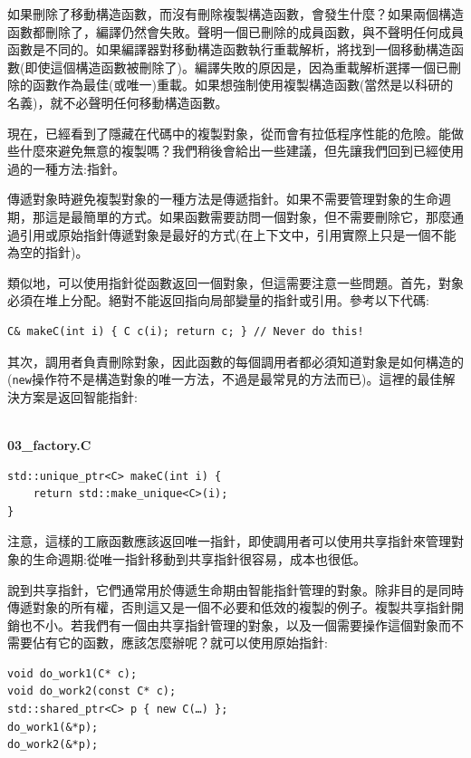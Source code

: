 如果刪除了移動構造函數，而沒有刪除複製構造函數，會發生什麼？如果兩個構造函數都刪除了，編譯仍然會失敗。聲明一個已刪除的成員函數，與不聲明任何成員函數是不同的。如果編譯器對移動構造函數執行重載解析，將找到一個移動構造函數(即使這個構造函數被刪除了)。編譯失敗的原因是，因為重載解析選擇一個已刪除的函數作為最佳(或唯一)重載。如果想強制使用複製構造函數(當然是以科研的名義)，就不必聲明任何移動構造函數。 

現在，已經看到了隱藏在代碼中的複製對象，從而會有拉低程序性能的危險。能做些什麼來避免無意的複製嗎？我們稍後會給出一些建議，但先讓我們回到已經使用過的一種方法:指針。


傳遞對象時避免複製對象的一種方法是傳遞指針。如果不需要管理對象的生命週期，那這是最簡單的方式。如果函數需要訪問一個對象，但不需要刪除它，那麼通過引用或原始指針傳遞對象是最好的方式(在上下文中，引用實際上只是一個不能為空的指針)。 

類似地，可以使用指針從函數返回一個對象，但這需要注意一些問題。首先，對象必須在堆上分配。絕對不能返回指向局部變量的指針或引用。參考以下代碼:

\begin{lstlisting}[style=styleCXX]
C& makeC(int i) { C c(i); return c; } // Never do this!
\end{lstlisting}

其次，調用者負責刪除對象，因此函數的每個調用者都必須知道對象是如何構造的(\texttt{new}操作符不是構造對象的唯一方法，不過是最常見的方法而已)。這裡的最佳解決方案是返回智能指針:

\hspace*{\fill} \\ %
\noindent
\textbf{03\_factory.C}
\begin{lstlisting}[style=styleCXX]
std::unique_ptr<C> makeC(int i) {
	return std::make_unique<C>(i);
}
\end{lstlisting}

注意，這樣的工廠函數應該返回唯一指針，即使調用者可以使用共享指針來管理對象的生命週期:從唯一指針移動到共享指針很容易，成本也很低。

說到共享指針，它們通常用於傳遞生命期由智能指針管理的對象。除非目的是同時傳遞對象的所有權，否則這又是一個不必要和低效的複製的例子。複製共享指針開銷也不小。若我們有一個由共享指針管理的對象，以及一個需要操作這個對象而不需要佔有它的函數，應該怎麼辦呢？就可以使用原始指針:

\begin{lstlisting}[style=styleCXX]
void do_work1(C* c);
void do_work2(const C* c);
std::shared_ptr<C> p { new C(…) };
do_work1(&*p);
do_work2(&*p);
\end{lstlisting}

